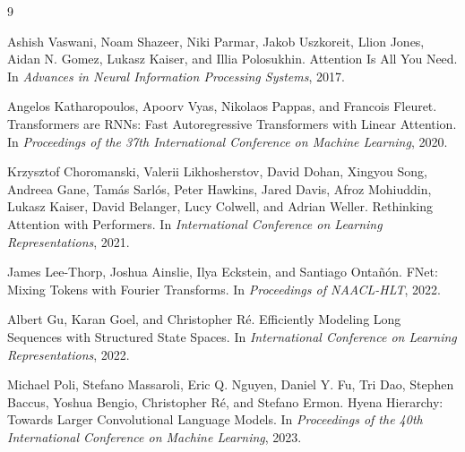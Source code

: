 \documentclass[11pt]{article}
\begin{document}
\begin{thebibliography}{9}

Ashish Vaswani, Noam Shazeer, Niki Parmar, Jakob Uszkoreit, Llion Jones, Aidan N. Gomez, Lukasz Kaiser, and Illia Polosukhin.
\newblock Attention Is All You Need.
\newblock In \emph{Advances in Neural Information Processing Systems}, 2017.

Angelos Katharopoulos, Apoorv Vyas, Nikolaos Pappas, and Francois Fleuret.
\newblock Transformers are RNNs: Fast Autoregressive Transformers with Linear Attention.
\newblock In \emph{Proceedings of the 37th International Conference on Machine Learning}, 2020.

Krzysztof Choromanski, Valerii Likhosherstov, David Dohan, Xingyou Song, Andreea Gane, Tam\'as Sarl\'os, Peter Hawkins, Jared Davis, Afroz Mohiuddin, Lukasz Kaiser, David Belanger, Lucy Colwell, and Adrian Weller.
\newblock Rethinking Attention with Performers.
\newblock In \emph{International Conference on Learning Representations}, 2021.

James Lee-Thorp, Joshua Ainslie, Ilya Eckstein, and Santiago Onta\~n\'on.
\newblock FNet: Mixing Tokens with Fourier Transforms.
\newblock In \emph{Proceedings of NAACL-HLT}, 2022.

Albert Gu, Karan Goel, and Christopher R\'e.
\newblock Efficiently Modeling Long Sequences with Structured State Spaces.
\newblock In \emph{International Conference on Learning Representations}, 2022.

Michael Poli, Stefano Massaroli, Eric Q. Nguyen, Daniel Y. Fu, Tri Dao, Stephen Baccus, Yoshua Bengio, Christopher R\'e, and Stefano Ermon.
\newblock Hyena Hierarchy: Towards Larger Convolutional Language Models.
\newblock In \emph{Proceedings of the 40th International Conference on Machine Learning}, 2023.

\end{thebibliography}
\end{document}
